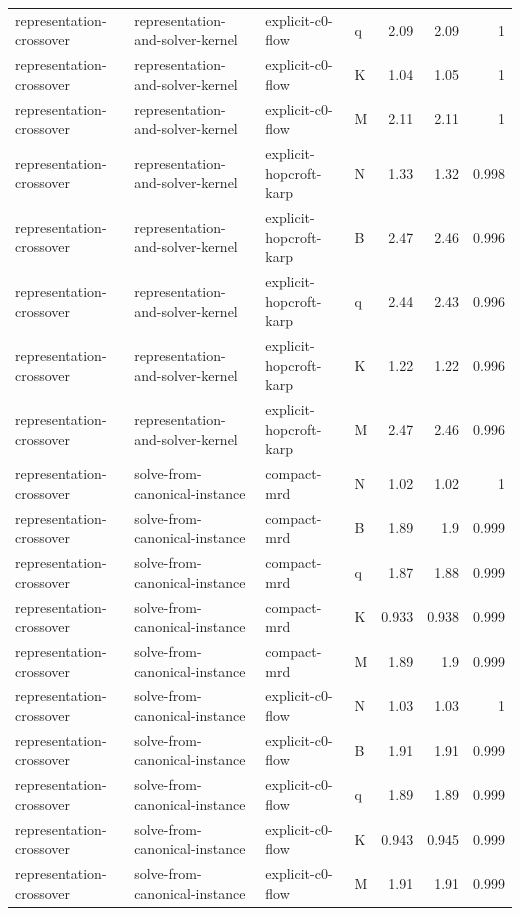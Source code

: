 \begin{table}[t]
\begin{tabular}{llllrrr}
representation-crossover & representation-and-solver-kernel & explicit-c0-flow & q & 2.09 & 2.09 & 1 \\
representation-crossover & representation-and-solver-kernel & explicit-c0-flow & K & 1.04 & 1.05 & 1 \\
representation-crossover & representation-and-solver-kernel & explicit-c0-flow & M & 2.11 & 2.11 & 1 \\
representation-crossover & representation-and-solver-kernel & explicit-hopcroft-karp & N & 1.33 & 1.32 & 0.998 \\
representation-crossover & representation-and-solver-kernel & explicit-hopcroft-karp & B & 2.47 & 2.46 & 0.996 \\
representation-crossover & representation-and-solver-kernel & explicit-hopcroft-karp & q & 2.44 & 2.43 & 0.996 \\
representation-crossover & representation-and-solver-kernel & explicit-hopcroft-karp & K & 1.22 & 1.22 & 0.996 \\
representation-crossover & representation-and-solver-kernel & explicit-hopcroft-karp & M & 2.47 & 2.46 & 0.996 \\
representation-crossover & solve-from-canonical-instance & compact-mrd & N & 1.02 & 1.02 & 1 \\
representation-crossover & solve-from-canonical-instance & compact-mrd & B & 1.89 & 1.9 & 0.999 \\
representation-crossover & solve-from-canonical-instance & compact-mrd & q & 1.87 & 1.88 & 0.999 \\
representation-crossover & solve-from-canonical-instance & compact-mrd & K & 0.933 & 0.938 & 0.999 \\
representation-crossover & solve-from-canonical-instance & compact-mrd & M & 1.89 & 1.9 & 0.999 \\
representation-crossover & solve-from-canonical-instance & explicit-c0-flow & N & 1.03 & 1.03 & 1 \\
representation-crossover & solve-from-canonical-instance & explicit-c0-flow & B & 1.91 & 1.91 & 0.999 \\
representation-crossover & solve-from-canonical-instance & explicit-c0-flow & q & 1.89 & 1.89 & 0.999 \\
representation-crossover & solve-from-canonical-instance & explicit-c0-flow & K & 0.943 & 0.945 & 0.999 \\
representation-crossover & solve-from-canonical-instance & explicit-c0-flow & M & 1.91 & 1.91 & 0.999 \\

\end{tabular}
\end{table}
